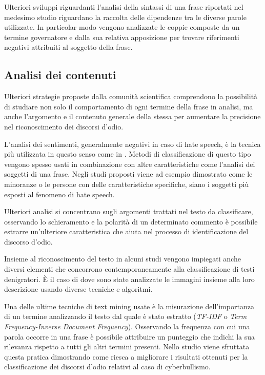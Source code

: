 Ulteriori sviluppi riguardanti l'analisi della sintassi di una frase riportati nel medesimo studio riguardano la raccolta delle dipendenze tra le diverse parole utilizzate. In particolar modo vengono analizzate le coppie composte da un termine governatore e dalla sua relativa apposizione per trovare riferimenti negativi attribuiti al soggetto della frase.


\subsection{Analisi dei contenuti}

Ulteriori strategie proposte dalla comunità scientifica comprendono la possibilità di studiare non solo il comportamento di ogni termine della frase in analisi, ma anche l'argomento e il contenuto generale della stessa per aumentare la precisione nel riconoscimento dei discorsi d'odio.

L’analisi dei sentimenti, generalmente negativi in caso di hate speech, è la tecnica più utilizzata in questo senso come in \cite{agarwal2017characterizing,offensivelang,stem2,ShuhuaDict,VignaInproceedings,articleNjagi}. Metodi di classificazione di questo tipo vengono spesso usati in combinazione con altre caratteristiche come l'analisi dei soggetti di una frase. Negli studi proposti viene ad esempio dimostrato come le minoranze o le persone con delle caratteristiche specifiche, siano i soggetti più esposti al fenomeno di hate speech.

Ulteriori analisi si concentrano sugli argomenti trattati nel testo da classificare, osservando lo schieramento e la polarità di un determinato commento è possibile estrarre un'ulteriore caratteristica che aiuta nel processo di identificazione del discorso d'odio.

Insieme al riconoscimento del testo in alcuni studi vengono impiegati anche diversi elementi che concorrono contemporaneamente alla classificazione di testi denigratori. È il caso di \cite{memeAndText} dove sono state analizzate le immagini insieme alla loro descrizione usando diverse tecniche e algoritmi.

Una delle ultime tecniche di text mining usate è la misurazione dell'importanza di un termine analizzando il testo dal quale è stato estratto (\textit{TF-IDF} o \textit{Term Frequency-Inverse Document Frequency}). Osservando la frequenza con cui una parola occorre in una frase è possibile attribuire un punteggio che indichi la sua rilevanza rispetto a tutti gli altri termini presenti. Nello studio \cite{KarthikDict} viene sfruttata questa pratica dimostrando come riesca a migliorare i risultati ottenuti per la classificazione dei discorsi d'odio relativi al caso di cyberbullismo.



